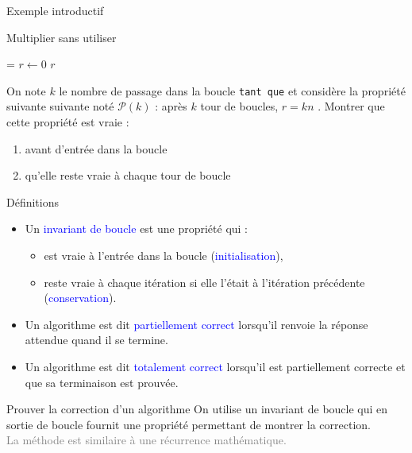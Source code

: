 \documentclass[10pt,french]{beamer}
\begin{document}
\begin{frame}[fragile]{\Ctitle}{\stitle}
	\begin{block}{Exemple introductif}
	\SetAlFnt{\small}
	\setlength{\algomargin}{8pt}
	\begin{algorithm}[H]
		\DontPrintSemicolon
		\caption{Multiplier sans utiliser {\tt *}}
		\everypar={\footnotesize \textcolor{gray}{\nl}}
		$r \leftarrow 0$\;
		\Return $r$
	  \end{algorithm}
	  On note $k$ le nombre de passage dans la boucle {\tt tant que} et considère la propriété suivante suivante noté $\mathcal{P}(k)$ : \og{} après $k$ tour de boucles, $r = kn$ \fg{}. Montrer que cette propriété est vraie :
	  \begin{enumerate}
	  \item<2-> avant d'entrée dans la boucle
	  \item<3-> qu'elle reste vraie à chaque tour de boucle
	  \end{enumerate}
	\end{block}
\end{frame}

\begin{frame}[fragile]{\Ctitle}{\stitle}
	\begin{block}{Définitions}
    \begin{itemize}
        \item<1-> Un \textcolor{blue}{invariant de boucle} est une propriété qui :
            \begin{itemize}
            \item<2-> est vraie à l'entrée dans la boucle (\textcolor{blue}{initialisation}),
            \item<3-> reste vraie à chaque itération si elle l'était à l'itération précédente (\textcolor{blue}{conservation}).
            \end{itemize}
		\item<4-> Un algorithme est dit \textcolor{blue}{partiellement correct} lorsqu'il renvoie la réponse attendue quand il se termine.
		\item<5-> Un algorithme est dit \textcolor{blue}{totalement correct} lorsqu'il est partiellement correcte et que sa terminaison est prouvée.
		\end{itemize}
	\end{block}
	{\begin{alertblock}{\textcolor{yellow}{\important \;} Prouver la correction d'un algorithme}
		On utilise un invariant de boucle qui en sortie de boucle fournit une propriété permettant de montrer la correction.\\
		\textcolor{gray}{La méthode est similaire à une récurrence mathématique.}
	\end{alertblock}}
\end{frame}
\end{document}
